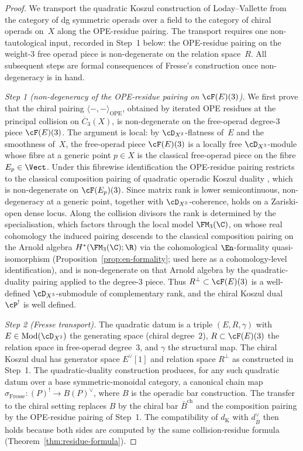 \begin{proof}
We transport the quadratic Koszul construction of
Loday--Vallette \cite[Ch.~7]{LV12} from the category of dg
symmetric operads over a field to the category of chiral
operads on~$X$ along the OPE-residue pairing. The transport
requires one non-tautological input, recorded in
Step~1 below: the OPE-residue pairing on the weight-$3$ free
operad piece is non-degenerate on the relation space~$R$.
All subsequent steps are formal consequences of Fresse's construction
once non-degeneracy is in hand.

\smallskip
\emph{Step 1 (non-degeneracy of the OPE-residue pairing on
$\cF(E)(3)$).}
We first prove that the chiral pairing
$\langle -,-\rangle_{\mathrm{OPE}}$, obtained by iterated OPE
residues at the principal collision on
$\overline{C}_{3}(X)$, is non-degenerate on the free-operad
degree-$3$ piece $\cF(E)(3)$. The argument is local: by
$\cD_{X^2}$-flatness of~$E$ and the smoothness of~$X$, the
free-operad piece $\cF(E)(3)$ is a locally free
$\cD_{X^3}$-module whose fibre at a generic point $p \in X$
is the classical free-operad piece on the fibre
$E_{p} \in \Vect$. Under this fibrewise identification the
OPE-residue pairing restricts to the classical composition
pairing of quadratic operadic Koszul duality
\cite[Ch.~7]{LV12}, which is non-degenerate on
$\cF(E_{p})(3)$. Since matrix rank is lower semicontinuous,
non-degeneracy at a generic point, together
with $\cD_{X^3}$-coherence, holds on a Zariski-open dense
locus.  Along the collision divisors the rank is determined by the
specialisation, which
factors through the local model $\FM_{3}(\C)$, on whose real
cohomology the induced pairing descends to the classical
composition pairing on the Arnold algebra
$H^*(\FM_3(\C);\R)$ via the cohomological
$\En$-formality quasi-isomorphism
\textup{(}Proposition~\textup{\ref{prop:en-formality}}\textup{;}
used here as a cohomology-level identification\textup{)}, and is
non-degenerate on that
Arnold algebra by the quadratic-duality pairing
\cite[Ch.~7]{LV12} applied to the degree-$3$ piece.
Thus $R^{\perp} \subset \cF(E)(3)$ is a well-defined
$\cD_{X^3}$-submodule of complementary rank, and the chiral
Koszul dual $\cP^{!}$ is well defined.

\smallskip
\emph{Step 2 (Fresse transport).}
The quadratic datum is a triple $(E,R,\gamma)$ with
$E \in \operatorname{Mod}(\cD_{X^2})$ the generating
space \textup{(}chiral degree~$2$\textup{)},
$R \subset \cF(E)(3)$ the relation space in free-operad
degree~$3$, and $\gamma$ the structural map. The chiral Koszul
dual has generator space $E^{\vee}[1]$ and relation space
$R^{\perp}$ as constructed in Step~1. The quadratic-duality construction
\cite[Ch.~7]{LV12} produces, for any
such quadratic datum over a base symmetric-monoidal category,
a canonical chain map
$\sigma_{\mathrm{Fresse}} \colon (P)^{!} \to
B(P)^{\vee}$, where $B$ is the operadic bar
construction. The transfer to the chiral setting replaces
$B$ by the chiral bar $\bar{B}^{\mathrm{ch}}$ and the
composition pairing by the OPE-residue pairing of Step~1.
The compatibility of $d_{\mathrm{K}}$ with $d_{\bar{B}}^{\vee}$
then holds because both sides are computed by the same
collision-residue formula
\textup{(}Theorem~\textup{\ref{thm:residue-formula}}\textup{)}.


\end{proof}

